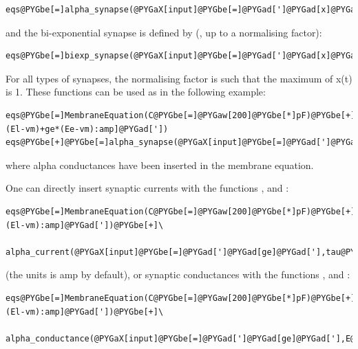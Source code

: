 \documentclass[letterpaper,10pt]{manual}
\begin{document}
\begin{Verbatim}[commandchars=@\[\]]
eqs@PYGbe[=]alpha_synapse(@PYGaX[input]@PYGbe[=]@PYGad[']@PYGad[x]@PYGad['],tau@PYGbe[=]@PYGaw[10]@PYGbe[*]ms,unit@PYGbe[=]amp)
\end{Verbatim}

and the bi-exponential synapse is defined by (,
up to a normalising factor):

\begin{Verbatim}[commandchars=@\[\]]
eqs@PYGbe[=]biexp_synapse(@PYGaX[input]@PYGbe[=]@PYGad[']@PYGad[x]@PYGad['],tau1@PYGbe[=]@PYGaw[10]@PYGbe[*]ms,tau2@PYGbe[=]@PYGaw[5]@PYGbe[*]ms,unit@PYGbe[=]amp)
\end{Verbatim}

For all types of synapses, the normalising factor is such that the maximum of x(t) is 1.
These functions can be used as in the following example:

\begin{Verbatim}[commandchars=@\[\]]
eqs@PYGbe[=]MembraneEquation(C@PYGbe[=]@PYGaw[200]@PYGbe[*]pF)@PYGbe[+]Current(@PYGad[']@PYGad[I=gl*(El-vm)+ge*(Ee-vm):amp]@PYGad['])
eqs@PYGbe[+]@PYGbe[=]alpha_synapse(@PYGaX[input]@PYGbe[=]@PYGad[']@PYGad[ge_in]@PYGad['],tau@PYGbe[=]@PYGaw[10]@PYGbe[*]ms,unit@PYGbe[=]siemens,output@PYGbe[=]@PYGad[']@PYGad[ge]@PYGad['])
\end{Verbatim}

where alpha conductances have been inserted in the membrane equation.

One can directly insert synaptic currents with the functions , 
and :

\begin{Verbatim}[commandchars=@\[\]]
eqs@PYGbe[=]MembraneEquation(C@PYGbe[=]@PYGaw[200]@PYGbe[*]pF)@PYGbe[+]Current(@PYGad[']@PYGad[I=gl*(El-vm):amp]@PYGad['])@PYGbe[+]\
    alpha_current(@PYGaX[input]@PYGbe[=]@PYGad[']@PYGad[ge]@PYGad['],tau@PYGbe[=]@PYGaw[10]@PYGbe[*]ms)
\end{Verbatim}

(the units is amp by default), or synaptic conductances with the functions , 
and \code{biexp\_conductance}:

\begin{Verbatim}[commandchars=@\[\]]
eqs@PYGbe[=]MembraneEquation(C@PYGbe[=]@PYGaw[200]@PYGbe[*]pF)@PYGbe[+]Current(@PYGad[']@PYGad[I=gl*(El-vm):amp]@PYGad['])@PYGbe[+]\
    alpha_conductance(@PYGaX[input]@PYGbe[=]@PYGad[']@PYGad[ge]@PYGad['],E@PYGbe[=]@PYGaw[0]@PYGbe[*]mV,tau@PYGbe[=]@PYGaw[10]@PYGbe[*]ms)
\end{Verbatim}
\end{document}
